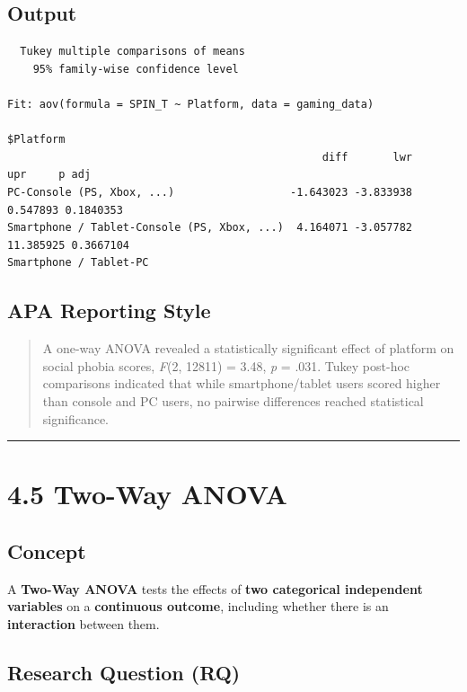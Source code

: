 \documentclass[
]{book}
\begin{document}
\subsection{Output}\label{output-4}

\begin{verbatim}
  Tukey multiple comparisons of means
    95% family-wise confidence level

Fit: aov(formula = SPIN_T ~ Platform, data = gaming_data)

$Platform
                                                 diff       lwr       upr     p adj
PC-Console (PS, Xbox, ...)                  -1.643023 -3.833938  0.547893 0.1840353
Smartphone / Tablet-Console (PS, Xbox, ...)  4.164071 -3.057782 11.385925 0.3667104
Smartphone / Tablet-PC 
\end{verbatim}

\subsection{APA Reporting Style}\label{apa-reporting-style-1}

\begin{quote}
A one-way ANOVA revealed a statistically significant effect of platform on social phobia scores, \emph{F}(2, 12811) = 3.48, \emph{p} = .031. Tukey post-hoc comparisons indicated that while smartphone/tablet users scored higher than console and PC users, no pairwise differences reached statistical significance.
\end{quote}

\begin{center}\rule{0.5\linewidth}{0.5pt}\end{center}

\section{4.5 Two-Way ANOVA}\label{two-way-anova}

\subsection{Concept}\label{concept-4}

A \textbf{Two-Way ANOVA} tests the effects of \textbf{two categorical independent variables} on a \textbf{continuous outcome}, including whether there is an \textbf{interaction} between them.

\subsection{Research Question (RQ)}\label{research-question-rq-2}
\end{document}
